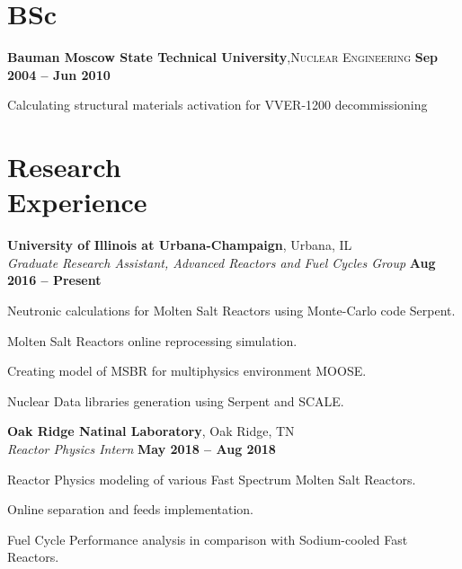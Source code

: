 \documentclass[margin,line]{resume}
\begin{document}
\begin{resume}
    \section{\mysidestyle BSc}
    \textbf{Bauman Moscow State Technical University},\textsc{Nuclear Engineering}\hfill \textbf{ Sep 2004 -- Jun 2010}\vspace{-3mm}\\\vspace{-1mm}%
    \begin{list2}
	\item Calculating structural materials activation for VVER-1200 decommissioning
    \end{list2}\vspace{-1.5mm}
    \section{\mysidestyle Research\\Experience}               
    \textbf{University of Illinois at Urbana-Champaign}, Urbana, IL\\
		\textsl{Graduate Research Assistant, Advanced Reactors and Fuel Cycles Group} \hfill \textbf{Aug 2016 -- Present}\\
                \vspace{-4mm}\begin{list2}
                \item Neutronic calculations for Molten Salt Reactors using Monte-Carlo code Serpent.
				\item Molten Salt Reactors online reprocessing simulation.
				\item Creating model of MSBR for multiphysics environment MOOSE.
				\item Nuclear Data libraries generation using Serpent and SCALE.
                \end{list2}

    \textbf{Oak Ridge Natinal Laboratory}, Oak Ridge, TN\\
		\textsl{Reactor Physics Intern} \hfill \textbf{May 2018 -- Aug 2018}\\
                \vspace{-4mm}\begin{list2}
                \item Reactor Physics modeling of various Fast Spectrum Molten Salt Reactors.
				\item Online separation and feeds implementation.
				\item Fuel Cycle Performance analysis in comparison with Sodium-cooled Fast Reactors.
                \end{list2}


\end{resume}
\end{document}
